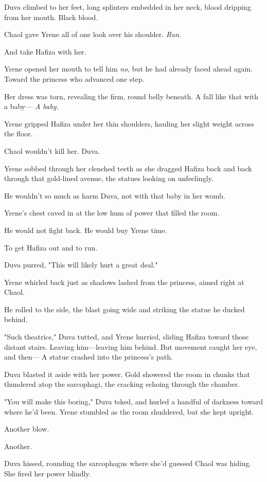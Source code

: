 Duva climbed to her feet, long splinters embedded in her neck, blood dripping from her mouth. Black blood.

Chaol gave Yrene all of one look over his shoulder. \emph{Run}.

And take Hafiza with her.

Yrene opened her mouth to tell him \emph{no}, but he had already faced ahead again. Toward the princess who advanced one step.

Her dress was torn, revealing the firm, round belly beneath. A fall like that with a baby--- \emph{A baby.}

Yrene gripped Hafiza under her thin shoulders, hauling her slight weight across the floor.

Chaol wouldn't kill her. Duva.

Yrene sobbed through her clenched teeth as she dragged Hafiza back and back through that gold-lined avenue, the statues looking on unfeelingly.

He wouldn't so much as harm Duva, not with that baby in her womb.

Yrene's chest caved in at the low hum of power that filled the room.

He would not fight back. He would buy Yrene time.

To get Hafiza out and to run.

Duva purred, "This will likely hurt a great deal."

Yrene whirled back just as shadows lashed from the princess, aimed right at Chaol.

He rolled to the side, the blast going wide and striking the statue he ducked behind.

"Such theatrics," Duva tutted, and Yrene hurried, sliding Hafiza toward those distant stairs. Leaving him---leaving him behind. But movement caught her eye, and then--- A statue crashed into the princess's path.

Duva blasted it aside with her power. Gold showered the room in chunks that thundered atop the sarcophagi, the cracking echoing through the chamber.

"You will make this boring," Duva tsked, and hurled a handful of darkness toward where he'd been. Yrene stumbled as the room shuddered, but she kept upright.

Another blow.

Another.

Duva hissed, rounding the sarcophagus where she'd guessed Chaol was hiding. She fired her power blindly.

